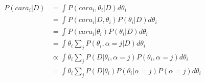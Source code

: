   \begin{equation}
  \label{eq:4}
  \begin{aligned}
	P(cara_i|D) &= \int P(cara_i, \theta_i|D) d\theta_i \\
					 &= \int P(cara_i|D, \theta_i)  P(\theta_i|D) d\theta_i \\
					 &= \int P(cara_i|\theta_i)  P(\theta_i|D) d\theta_i \\ 
					 &= \int \theta_i  \sum_j P(\theta_i, \alpha = j|D) d\theta_i \\ 
					 &\propto \int \theta_i  \sum_j P(D|\theta_i, \alpha = j) P(\theta_i, \alpha = j) d\theta_i \\ 
					 &= \int \theta_i  \sum_j P(D|\theta_i) P(\theta_i | \alpha = j) P(\alpha = j) d\theta_i \\ 
  \end{aligned}
  \end{equation}